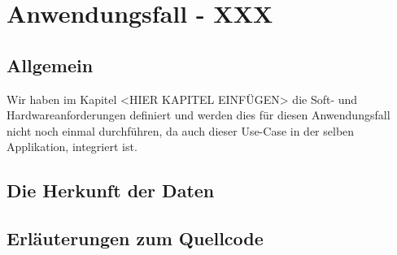 \chapter{Anwendungsfall - XXX}
\label{sec:anwendungsfall-xxx}

\section{Allgemein}
Wir haben im Kapitel <HIER KAPITEL EINFÜGEN> die Soft- und Hardwareanforderungen definiert und werden
dies für diesen Anwendungsfall nicht noch einmal durchführen, da auch dieser Use-Case in der
selben Applikation, integriert ist.

\section{Die Herkunft der Daten}

\section{Erläuterungen zum Quellcode}
